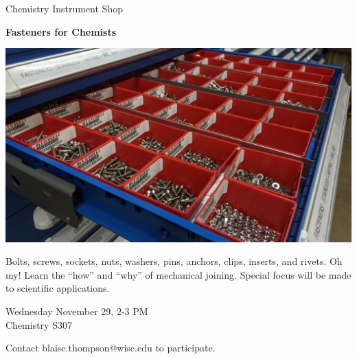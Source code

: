 \documentclass{article}
\begin{document}
\center

\Huge

Chemistry Instrument Shop

\textbf{
Fasteners for Chemists
}

\includegraphics[width=\linewidth]{coverart.jpg}

{
\huge
Bolts, screws, sockets, nuts, washers, pins, anchors, clips, inserts, and rivets.
Oh my!
Learn the ``how'' and ``why'' of mechanical joining.
Special focus will be made to scientific applications.
}

\vfill

{
\huge
Wednesday November 29, 2-3 PM \\
Chemistry S307
}

\vfill

{
\huge
Contact blaise.thompson@wisc.edu to participate.
}
\end{document}
